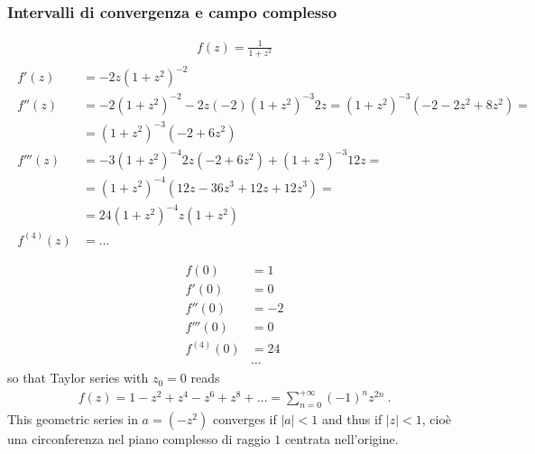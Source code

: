 \documentclass[letterpaper,10pt,italian]{jupyterBook}
\begin{document}
\subsubsection*{Intervalli di convergenza e campo complesso}
\begin{equation*}
\begin{split}f(z) = \frac{1}{1+z^2}\end{split}
\end{equation*}\begin{equation*}
\begin{split}\begin{aligned}
  f'  (z) & = - 2 z ( 1 + z^2 )^{-2} \\
  f'' (z) & = - 2 ( 1 + z^2 )^{-2} - 2 z (-2) ( 1 + z^2 )^{-3} 2 z = ( 1 + z^2 )^{-3} ( -2 - 2 z^2 + 8 z^2 ) = \\
          & = ( 1 + z^2 )^{-3} ( - 2 + 6 z^2 ) \\
  f'''(z) & = -3 (1+z^2)^{-4} 2 z ( -2 + 6 z^2 ) + ( 1 + z^2 )^{-3} 12 z = \\
          & = ( 1 + z^2 )^{-4} ( 12 z - 36 z^3 + 12 z + 12 z^3 ) = \\
          & = 24 ( 1 + z^2 )^{-4} z ( 1 + z^2 ) \\
  f^{(4)}(z) & = \dots \\
\end{aligned}\end{split}
\end{equation*}\begin{equation*}
\begin{split}\begin{aligned}
 f(0) & = 1 \\
 f'(0) & = 0 \\
 f''(0) & = -2 \\
 f'''(0) & = 0 \\
 f^{(4)}(0) & = 24 \\
 & \dots
\end{aligned}\end{split}
\end{equation*}
\sphinxAtStartPar
so that Taylor series with \(z_0 = 0\) reads
\begin{equation*}
\begin{split}f(z) = 1 - z^2 + z^4 - z^6 + z^8 + \dots = \sum_{n=0}^{+\infty} (-1)^n z^{2n} \ .\end{split}
\end{equation*}
\sphinxAtStartPar
This geometric series in \(a = (-z^2)\) converges if \(|a| < 1\) and thus if \(| z | < 1\), cioè una circonferenza nel piano complesso di raggio \(1\) centrata nell’origine.
\end{document}

